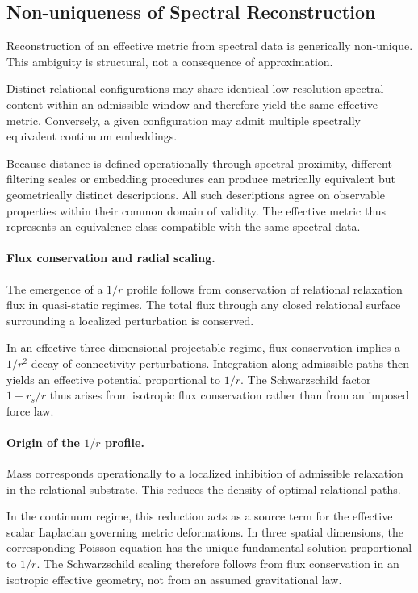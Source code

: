 \subsection{Non-uniqueness of Spectral Reconstruction}
  \label{subsec:non-uniqueness}

  Reconstruction of an effective metric from spectral data is generically non-unique.
  This ambiguity is structural, not a consequence of approximation.

  Distinct relational configurations may share identical low-resolution
  spectral content within an admissible window and therefore yield the same
  effective metric.
  Conversely, a given configuration may admit multiple spectrally equivalent
  continuum embeddings.

  Because distance is defined operationally through spectral proximity,
  different filtering scales or embedding procedures can produce metrically
  equivalent but geometrically distinct descriptions.
  All such descriptions agree on observable properties within their common
  domain of validity.
  The effective metric thus represents an equivalence class compatible with
  the same spectral data.

  \paragraph{Flux conservation and radial scaling.}

    The emergence of a $1/r$ profile follows from conservation of relational
    relaxation flux in quasi-static regimes.
    The total flux through any closed relational surface surrounding a localized
    perturbation is conserved.

    In an effective three-dimensional projectable regime,
    flux conservation implies a $1/r^{2}$ decay of connectivity perturbations.
    Integration along admissible paths then yields an effective potential
    proportional to $1/r$.
    The Schwarzschild factor $1 - r_s/r$ thus arises from isotropic
    flux conservation rather than from an imposed force law.

  \paragraph{Origin of the $1/r$ profile.}

    Mass corresponds operationally to a localized inhibition of admissible
    relaxation in the relational substrate.
    This reduces the density of optimal relational paths.

    In the continuum regime, this reduction acts as a source term for the
    effective scalar Laplacian governing metric deformations.
    In three spatial dimensions, the corresponding Poisson equation has the
    unique fundamental solution proportional to $1/r$.
    The Schwarzschild scaling therefore follows from flux conservation in an
    isotropic effective geometry, not from an assumed gravitational law.

